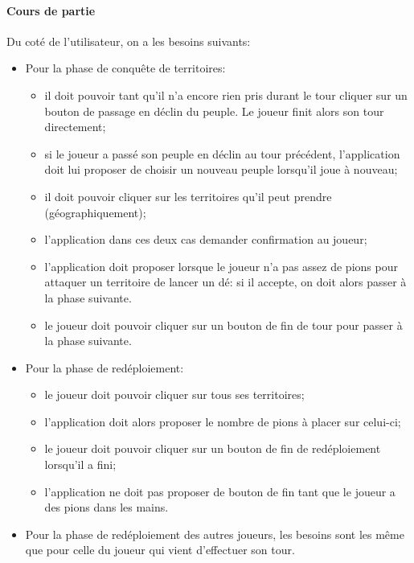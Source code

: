 \documentclass[a4paper, 11pt]{article}
\begin{document}
			\paragraph{Cours de partie\\}
			
			Du coté de l'utilisateur, on a les besoins suivants:\\
			\begin{itemize}
				\item Pour la phase de conquête de territoires:
				\begin{itemize}
					\item il doit pouvoir tant qu'il n'a encore rien pris durant le tour cliquer sur un bouton de passage en déclin du peuple. Le joueur finit alors son tour directement;
					\item si le joueur a passé son peuple en déclin au tour précédent, l'application doit lui proposer de choisir un nouveau peuple lorsqu'il joue à nouveau;
					\item il doit pouvoir cliquer sur les territoires qu'il peut prendre (géographiquement);
					\item l'application dans ces deux cas demander confirmation au joueur;
					\item l'application doit proposer lorsque le joueur n'a pas assez de pions pour attaquer un territoire de lancer un dé: si il accepte, on doit alors passer à la phase suivante.
					\item le joueur doit pouvoir cliquer sur un bouton de fin de tour pour passer à la phase suivante. \\
				\end{itemize}
				\item Pour la phase de redéploiement:
				\begin{itemize}
					\item le joueur doit pouvoir cliquer sur tous ses territoires;
					\item l'application doit alors proposer le nombre de pions à placer sur celui-ci;
					\item le joueur doit pouvoir cliquer sur un bouton de fin de redéploiement lorsqu'il a fini;
					\item l'application ne doit pas proposer de bouton de fin tant que le joueur a des pions dans les mains. \\
				\end{itemize}
				\item Pour la phase de redéploiement des autres joueurs, les besoins sont les même que pour celle du joueur qui vient d'effectuer son tour.	 \\	
			\end{itemize}
\end{document}
